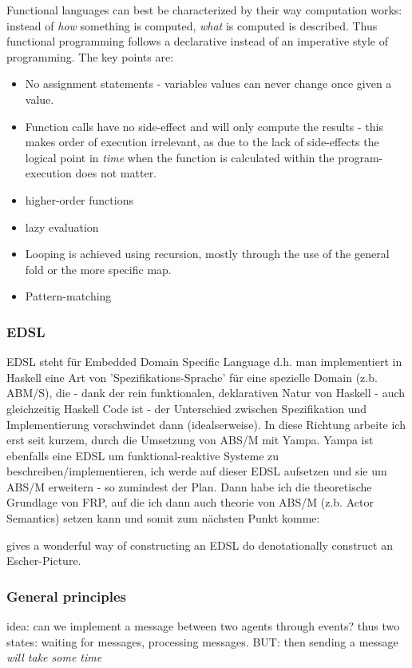 Functional languages can best be characterized by their way computation works: instead of \textit{how} something is computed, \textit{what} is computed is described. Thus functional programming follows a declarative instead of an imperative style of programming. The key points are:
\begin{itemize}
\item No assignment statements - variables values can never change once given a value.
\item Function calls have no side-effect and will only compute the results - this makes order of execution irrelevant, as due to the lack of side-effects the logical point in \textit{time} when the function is calculated within the program-execution does not matter.
\item higher-order functions
\item lazy evaluation
\item Looping is achieved using recursion, mostly through the use of the general fold or the more specific map.
\item Pattern-matching
\end{itemize}


\subsubsection{EDSL}
EDSL steht für Embedded Domain Specific Language d.h. man implementiert in Haskell eine Art von 'Spezifikations-Sprache' für eine spezielle Domain (z.b. ABM/S), die - dank der rein funktionalen, deklarativen Natur von Haskell - auch gleichzeitig Haskell Code ist - der Unterschied zwischen Spezifikation und Implementierung verschwindet dann (idealserweise). In diese Richtung arbeite ich erst seit kurzem, durch die Umsetzung von ABS/M mit Yampa. Yampa ist ebenfalls eine EDSL um funktional-reaktive Systeme zu beschreiben/implementieren, ich werde auf dieser EDSL aufsetzen und sie um ABS/M erweitern - so zumindest der Plan. Dann habe ich die theoretische Grundlage von FRP, auf die ich dann auch theorie von ABS/M (z.b. Actor Semantics) setzen kann und somit zum nächsten Punkt komme:

\cite{Henderson1982} gives a wonderful way of constructing an EDSL do denotationally construct an Escher-Picture.


\subsubsection{General principles}
idea: can we implement a message between two agents through events? thus two states: waiting for messages, processing messages. BUT: then sending a message \textit{will take some time}

